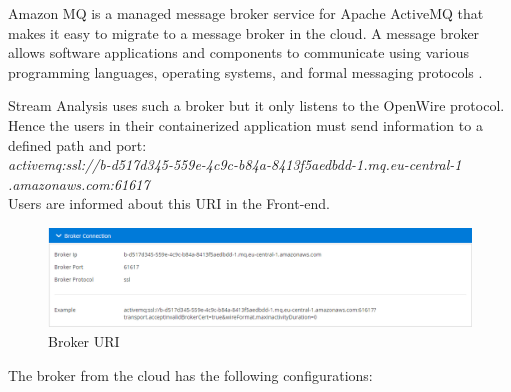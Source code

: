Amazon MQ is a managed message broker service for Apache ActiveMQ that makes it easy to migrate to a message broker in the cloud. A message broker allows software applications and components to communicate using various programming languages, operating systems, and formal messaging protocols \cite{amazon-mq}.

Stream Analysis uses such a broker but it only listens to the OpenWire protocol. Hence the users in their containerized application must send information to a defined path and port:\\ 

\textit{activemq:ssl://b-d517d345-559e-4c9c-b84a-8413f5aedbdd-1.mq.eu-central-1
	.amazonaws.com:61617}\\

Users are informed about this URI in the Front-end.

\begin{figure}[h]
	\centering
	\includegraphics[width=1\linewidth]{./images/webapp/broker.PNG}
	\caption{Broker URI}
	\label{fig:broker}
\end{figure}

The broker from the cloud has the following configurations:

